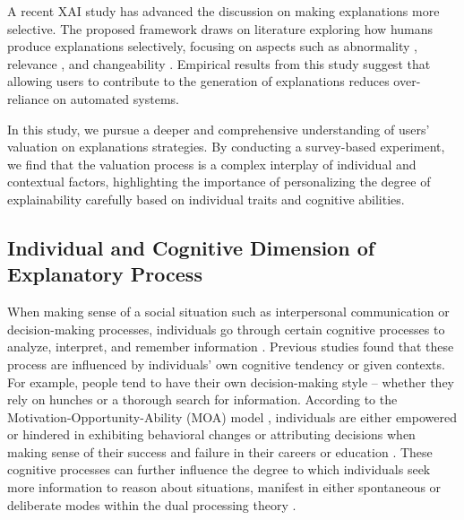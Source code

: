 A recent XAI study \cite{SelectiveExplanationsLeveragingHumanInput} has advanced the discussion on making explanations more selective. The proposed framework draws on literature exploring how humans produce explanations selectively, focusing on aspects such as abnormality \cite{hilton1986knowledge}, relevance \cite{woodward2006sensitive}, and changeability \cite{hilton2007course}. Empirical results from this study suggest that allowing users to contribute to the generation of explanations reduces over-reliance on automated systems.

In this study, we pursue a deeper and comprehensive understanding of users' valuation on explanations strategies. By conducting a survey-based experiment, we find that the valuation process is a complex interplay of individual and contextual factors, highlighting the importance of personalizing the degree of explainability carefully based on individual traits and cognitive abilities.


\subsection{Individual and Cognitive Dimension of Explanatory Process}
\label{sec:related-work-cognition}

When making sense of a social situation such as interpersonal communication or decision-making processes, individuals go through certain cognitive processes to analyze, interpret, and remember information \cite{SocialCognition}. Previous studies found that these process are influenced by individuals’ own cognitive tendency or given contexts. For example, people tend to have their own decision-making style \cite{DecisionmakingstylesreallifedecisionChoosing,Individualdifferencesadultdecisionmakingcompetence, DecisionMakingStyleDevelopmentAssessmentNew} -- whether they rely on hunches or a thorough search for information. According to the Motivation-Opportunity-Ability (MOA) model \cite{EnhancingMeasuringConsumersMotivationOpportunity}, individuals are either empowered or hindered in exhibiting behavioral changes or attributing decisions when making sense of their success and failure in their careers or education \cite{weiner1972attribution}. These cognitive processes can further influence the degree to which individuals seek more information to reason about situations, manifest in either spontaneous or deliberate modes within the dual processing theory \cite{SocialCognition, CogitoergoquidEffectCognitive, InfluenceCognitiveStylesUsersUnderstandinga}.

